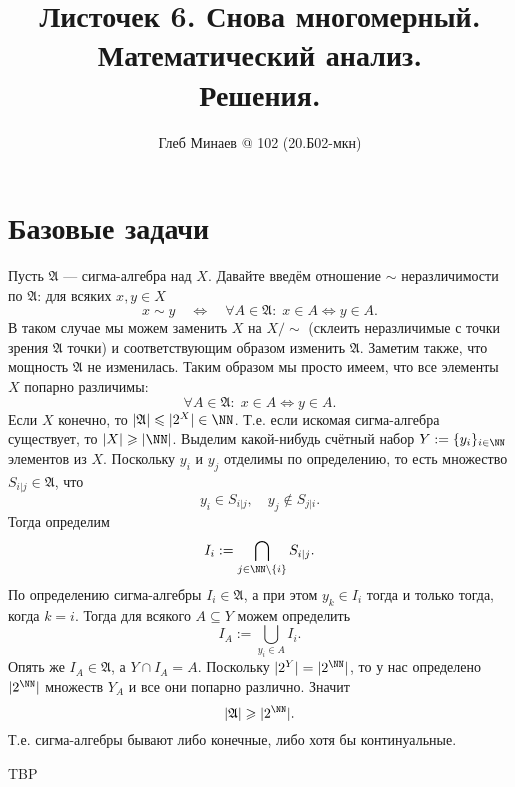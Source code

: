 \documentclass[12pt,a4paper]{article}
\title{Листочек 6. Снова многомерный.\\Математический анализ.\\Решения.}
\author{Глеб Минаев @ 102 (20.Б02-мкн)}
\begin{document}
    \maketitle

    \begin{multicols}{2}
        \tableofcontents
    \end{multicols}

    \section*{Базовые задачи}

    \begin{enumproblem}
        Пусть $\mathfrak{A}$ --- сигма-алгебра над $X$. Давайте введём отношение $\sim$ неразличимости по $\mathfrak{A}$: для всяких $x, y \in X$
        \[x \sim y \quad \Longleftrightarrow \quad \forall A \in \mathfrak{A}\colon \; x \in A \Leftrightarrow y \in A.\]
        В таком случае мы можем заменить $X$ на $X/\sim$ (склеить неразличимые с точки зрения $\mathfrak{A}$ точки) и соответствующим образом изменить $\mathfrak{A}$. Заметим также, что мощность $\mathfrak{A}$ не изменилась. Таким образом мы просто имеем, что все элементы $X$ попарно различимы:
        \[\forall A \in \mathfrak{A}\colon \; x \in A \Leftrightarrow y \in A.\]
        Если $X$ конечно, то $|\mathfrak{A}| \leqslant |2^X| \in \NN$. Т.е. если искомая сигма-алгебра существует, то $|X| \geqslant |\NN|$. Выделим какой-нибудь счётный набор $Y := \{y_i\}_{i \in \NN}$ элементов из $X$. Поскольку $y_i$ и $y_j$ отделимы по определению, то есть множество $S_{i|j} \in \mathfrak{A}$, что
        \[y_i \in S_{i|j}, \quad y_j \notin S_{j|i}.\]
        Тогда определим
        \[I_i := \bigcap_{j \in \NN \setminus \{i\}} S_{i|j}.\]
        По определению сигма-алгебры $I_i \in \mathfrak{A}$, а при этом $y_k \in I_i$ тогда и только тогда, когда $k=i$. Тогда для всякого $A \subseteq Y$ можем определить
        \[I_A := \bigcup_{y_i \in A} I_i.\]
        Опять же $I_A \in \mathfrak{A}$, а $Y \cap I_A = A$. Поскольку $|2^Y| = |2^\NN|$, то у нас определено $|2^\NN|$ множеств $Y_A$ и все они попарно различно. Значит
        \[|\mathfrak{A}| \geqslant |2^\NN|.\]
        Т.е. сигма-алгебры бывают либо конечные, либо хотя бы континуальные.
    \end{enumproblem}

    \begin{enumproblem}
        TBP
    \end{enumproblem}
\end{document}
